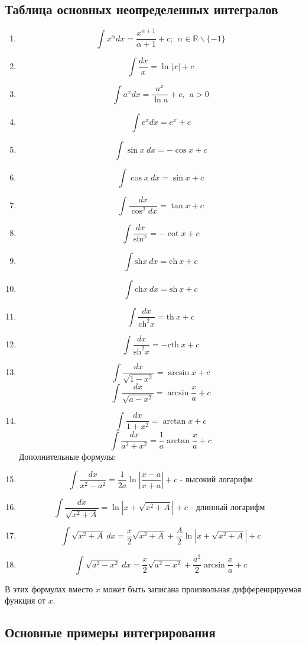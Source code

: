 \documentclass[a4paper,12pt]{article}
\theoremstyle{remark}
\begin{document}
\subsection{Таблица основных неопределенных интегралов}
\begin{enumerate}
	\item $$\int x^\alpha dx=\frac{x^{\alpha+1}}{\alpha+1}+c;\>\>\alpha\in\mathbb{R}\backslash\{-1\}$$
	\item $$\int\frac{dx}{x}=\ln|x|+c$$
	\item $$\int a^xdx=\frac{a^x}{\ln a}+c,\>\>a>0$$
	\item $$\int e^xdx=e^x+c$$
	\item $$\int\sin x\>dx	=-\cos x+c$$
	\item $$\int\cos x\>dx=\sin x+c$$
	\item $$\int\frac{dx}{\cos^2dx}=\tan x+c$$
	\item $$\int\frac{dx}{\sin^x}=-\cot x+c$$
	\item $$\int\textrm{sh}x\>dx=\textrm{ch}\>x+c$$
	\item $$\int\textrm{ch}x\>dx=\textrm{sh}\>x+c$$
	\item $$\int\frac{dx}{\textrm{ch}^2x}=\textrm{th}\>x+c$$
	\item $$\int\frac{dx}{\textrm{sh}^2x}=-\textrm{cth}\>x+c$$
	\item $$\int\frac{dx}{\sqrt{1-x^2}}=\arcsin x+c$$
		$$\int\frac{dx}{\sqrt{a-x^2}}=\arcsin \frac{x}{a}+c$$
	\item $$\int\frac{dx}{1+x^2}=\arctan x+c$$
		$$\int\frac{dx}{a^2+x^2}=\frac{1}{a}\arctan\frac{x}{a}+c$$
		Дополнительные формулы: 
	\item $$\int\frac{dx}{x^2-a^2}=\frac{1}{2a}\ln|\frac{x-a}{x+a}|+c\textrm{ - высокий логарифм}$$ 
	\item $$\int\frac{dx}{\sqrt{x^2+A}}=\ln|x+\sqrt{x^2+A}|+c\textrm{ - длинный логарифм }$$
	\item $$\int\sqrt{x^2+A}\>dx=\frac{x}{2}\sqrt{x^2+A}+\frac{A}{2}\ln|x+\sqrt{x^2+A}|+c$$
	\item $$\int\sqrt{a^2-x^2}\>dx=\frac{x}{2}\sqrt{a^2-x^2}+\frac{a^2}{2}\arcsin\frac{x}{a}+c$$
\end{enumerate}
В этих формулах вместо $x$ может быть записана произвольная дифференцируемая функция от $x$.
\subsection{Основные примеры интегрирования}
\end{document}
